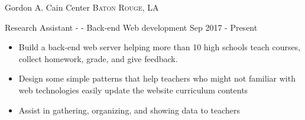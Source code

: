 \documentclass[10pt,a4paper]{article}
\begin{document}










\spacedhrule{0em}{-0.8em}


  \headedsection
{Gordon A. Cain Center}
{\textsc{Baton Rouge, LA}}
{
  \headedsubsection
  {Research Assistant - - Back-end Web development}
  {Sep 2017 - Present}
  {
    \begin{itemize}
    \item Build a back-end web server helping more than 10 high schools teach courses, collect homework, grade, and give feedback.
    \item Design some simple patterns that help teachers who might not familiar with web technologies easily update the website curriculum contents
    \item Assist in gathering, organizing, and showing data to teachers
    \end{itemize}
  }
}
\end{document}
